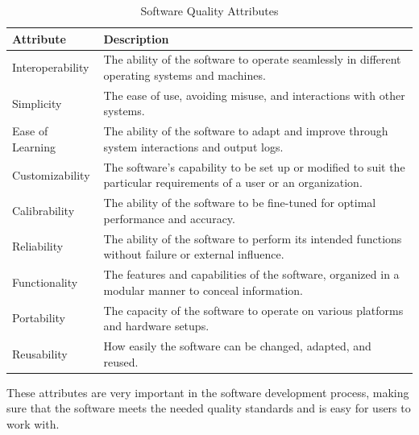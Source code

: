 \begin{table}[H]
    \centering
\caption{Software Quality Attributes}
\label{tab:software-attributes}
\begin{tabularx}{\textwidth}{lX}
\toprule
\textbf{Attribute} & \textbf{Description} \\
\midrule
Interoperability & The ability of the software to operate seamlessly in different operating systems and machines. \\
Simplicity & The ease of use, avoiding misuse, and interactions with other systems. \\
Ease of Learning & The ability of the software to adapt and improve through system interactions and output logs. \\
Customizability & The software's capability to be set up or modified to suit the particular requirements of a user or an organization. \\
Calibrability & The ability of the software to be fine-tuned for optimal performance and accuracy. \\
Reliability & The ability of the software to perform its intended functions without failure or external influence. \\
Functionality & The features and capabilities of the software, organized in a modular manner to conceal information. \\
Portability & The capacity of the software to operate on various platforms and
hardware setups. \\
Reusability & How easily the software can be changed, adapted, and reused. \\
\bottomrule
\end{tabularx}
\end{table}

These attributes are very important in the software development process, making
sure that the software meets the needed quality standards and is easy for users
to work with.




